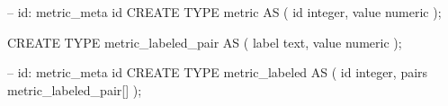 \begin{SQL}
-- id: metric_meta id
CREATE TYPE metric AS (
	id integer,
	value numeric
);


CREATE TYPE metric_labeled_pair AS
(
	label text,
	value numeric
);

-- id: metric_meta id
CREATE TYPE metric_labeled AS
(
	id integer,
	pairs metric_labeled_pair[]
);
\end{SQL}
